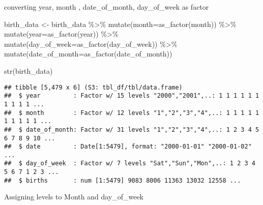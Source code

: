 \documentclass[
]{article}
\newenvironment{Shaded}{\begin{snugshade}}{\end{snugshade}}
\newcommand{\AttributeTok}[1]{\textcolor[rgb]{0.77,0.63,0.00}{#1}}
\newcommand{\FunctionTok}[1]{\textcolor[rgb]{0.00,0.00,0.00}{#1}}
\newcommand{\NormalTok}[1]{#1}
\newcommand{\OtherTok}[1]{\textcolor[rgb]{0.56,0.35,0.01}{#1}}
\newcommand{\SpecialCharTok}[1]{\textcolor[rgb]{0.00,0.00,0.00}{#1}}
\newcommand{\StringTok}[1]{\textcolor[rgb]{0.31,0.60,0.02}{#1}}
\begin{document}
converting year, month , date\_of\_month, day\_of\_week as factor

\begin{Shaded}
\begin{Highlighting}[]
\NormalTok{birth\_data }\OtherTok{\textless{}{-}}\NormalTok{ birth\_data }\SpecialCharTok{\%\textgreater{}\%}
  \FunctionTok{mutate}\NormalTok{(}\AttributeTok{month=}\FunctionTok{as\_factor}\NormalTok{(month)) }\SpecialCharTok{\%\textgreater{}\%}
  \FunctionTok{mutate}\NormalTok{(}\AttributeTok{year=}\FunctionTok{as\_factor}\NormalTok{(year)) }\SpecialCharTok{\%\textgreater{}\%}
  \FunctionTok{mutate}\NormalTok{(}\AttributeTok{day\_of\_week=}\FunctionTok{as\_factor}\NormalTok{(day\_of\_week)) }\SpecialCharTok{\%\textgreater{}\%}
  \FunctionTok{mutate}\NormalTok{(}\AttributeTok{date\_of\_month=}\FunctionTok{as\_factor}\NormalTok{(date\_of\_month))}

\FunctionTok{str}\NormalTok{(birth\_data)}
\end{Highlighting}
\end{Shaded}

\begin{verbatim}
## tibble [5,479 x 6] (S3: tbl_df/tbl/data.frame)
##  $ year         : Factor w/ 15 levels "2000","2001",..: 1 1 1 1 1 1 1 1 1 1 ...
##  $ month        : Factor w/ 12 levels "1","2","3","4",..: 1 1 1 1 1 1 1 1 1 1 ...
##  $ date_of_month: Factor w/ 31 levels "1","2","3","4",..: 1 2 3 4 5 6 7 8 9 10 ...
##  $ date         : Date[1:5479], format: "2000-01-01" "2000-01-02" ...
##  $ day_of_week  : Factor w/ 7 levels "Sat","Sun","Mon",..: 1 2 3 4 5 6 7 1 2 3 ...
##  $ births       : num [1:5479] 9083 8006 11363 13032 12558 ...
\end{verbatim}

Assigning levels to Month and day\_of\_week

\begin{Shaded}
\end{Shaded}
\end{document}
